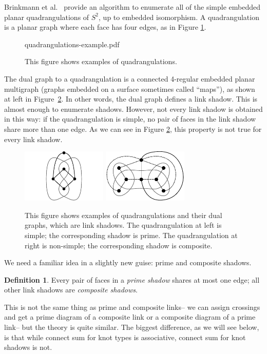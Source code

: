 \documentclass[amsmath,secnumarabic,amssymb,floatfix,nofootinbib,nobibnotes,letterpaper,11pt,tightenlines,showkeys]{revtex4}
\theoremstyle{definition}
\newtheorem{definition}[theorem]{Definition}
\let\mgp=\marginpar \marginparwidth18mm \marginparsep1mm
\def\marginpar#1{\mgp{\raggedright\tiny #1}}
\let\lbl=\label
\def\label#1{\lbl{#1}\ifinner\else\marginpar{\ref{#1} #1}\ignorespaces\fi}
\begin{document}
Brinkmann et al.~\cite{Brinkmann:2007up} provide an algorithm to enumerate all of the simple embedded planar quadrangulations of $S^2$, up to embedded isomorphism. A quadrangulation is a planar graph where each face has four edges, as in Figure \ref{fig:QuadExamples}.
\begin{figure}[H]
	\begin{center}
	\begin{overpic}[width=3in]{quadrangulations-example.pdf}
	\end{overpic}
	\end{center}
	\caption{\label{fig:QuadExamples} This figure shows examples of quadrangulations.}
\end{figure}
The dual graph to a quadrangulation is a connected 4-regular embedded planar multigraph (graphs embedded on a surface sometimes called ``maps''), as shown at left in Figure~\ref{fig:NonSimpleQuad}. In other words, the dual graph defines a link shadow. This is almost enough to enumerate shadows. However, not every link shadow is obtained in this way: if the quadrangulation is simple, no pair of faces in the link shadow share more than one edge. As we can see in Figure \ref{fig:NonSimpleQuad}, this property is not true for every link shadow.
\begin{figure}[H]
\hphantom{.}
\hfill
\includegraphics[height=1in]{quadrangulation} \hfill
\includegraphics[height=1in]{non-simple-quadrangulation}
\hfill
\hphantom{.}
\caption{\label{fig:NonSimpleQuad} This figure shows examples of quadrangulations and their dual graphs, which are link shadows. The quadrangulation at left is simple; the corresponding shadow is prime. The quadrangulation at right is non-simple; the corresponding shadow is composite.}
\end{figure}
We need a familiar idea in a slightly new guise: prime and composite shadows.
\begin{definition}
Every pair of faces in a \emph{prime shadow} shares at most one edge; all other link shadows are \emph{composite shadows}.
\end{definition}
This is not the same thing as prime and composite links-- we can assign crossings and get a prime diagram of a composite link or a composite diagram of a prime link-- but the theory is quite similar. The biggest difference, as we will see below, is that while connect sum for knot types is associative, connect sum for knot shadows is not.
\end{document}
